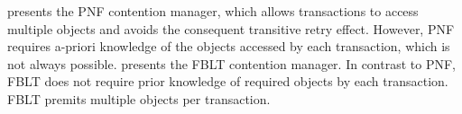 \documentclass[letter]{sig-alternate}
\begin{document}
%
\cite{pnf_dac_asp} presents the PNF contention manager, which allows transactions to access  multiple objects and avoids the consequent transitive retry effect. 
However, PNF requires a-priori knowledge of the objects accessed by each transaction, which is not always possible. 
%
\cite{fblt} presents the FBLT contention manager. In contrast to PNF, FBLT does not require prior knowledge of required objects by each transaction. FBLT premits multiple objects per transaction.
\end{document}
